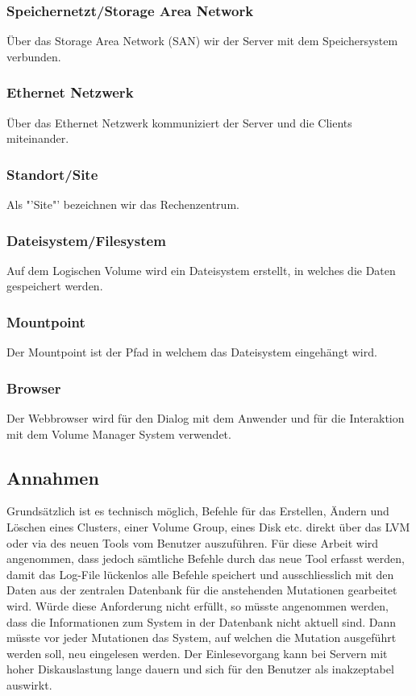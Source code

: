 \subsubsection{Speichernetzt/Storage Area Network}
Über das Storage Area Network (\gls{SAN}) wir der Server mit dem Speichersystem verbunden.

\subsubsection{Ethernet Netzwerk}
Über das Ethernet Netzwerk kommuniziert der Server und die Clients miteinander.

\subsubsection{Standort/Site}
Als "'Site"' bezeichnen wir das Rechenzentrum. 

\subsubsection{Dateisystem/Filesystem}
Auf dem Logischen Volume wird ein Dateisystem erstellt, in welches die Daten gespeichert werden.

\subsubsection{Mountpoint}
Der Mountpoint ist der Pfad in welchem das Dateisystem eingehängt wird.

\subsubsection{Browser}
Der Webbrowser wird für den Dialog mit dem Anwender und für die Interaktion mit dem Volume Manager System verwendet.

\subsection{Annahmen}
Grundsätzlich ist es technisch möglich, Befehle für das Erstellen, Ändern und Löschen eines Clusters, einer Volume Group, eines Disk etc. direkt über das LVM oder via des neuen Tools vom Benutzer auszuführen. Für diese Arbeit wird angenommen, dass jedoch sämtliche Befehle durch das neue Tool erfasst werden, damit das Log-File lückenlos alle Befehle speichert und ausschliesslich mit den Daten aus der zentralen Datenbank für die anstehenden Mutationen gearbeitet wird. 
Würde diese Anforderung nicht erfüllt, so müsste angenommen werden, dass die Informationen zum System in der Datenbank nicht aktuell sind. Dann müsste vor jeder Mutationen das System, auf welchen die Mutation ausgeführt werden soll, neu eingelesen werden. Der Einlesevorgang kann bei Servern mit hoher Diskauslastung lange dauern und sich für den Benutzer als inakzeptabel auswirkt.



